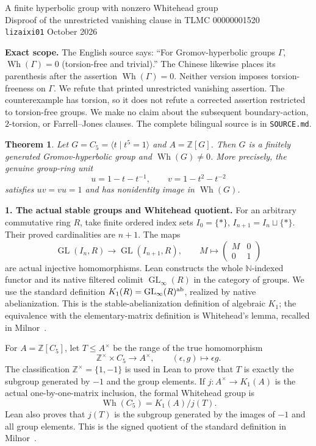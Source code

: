 \documentclass[10pt]{article}
\newtheorem{theorem}{Theorem}
\newcommand{\Z}{\mathbb Z}
\newcommand{\Wh}{\operatorname{Wh}}
\newcommand{\GL}{\operatorname{GL}}
\begin{document}
\begin{center}
{\Large A finite hyperbolic group with nonzero Whitehead group}\\[4pt]
{\large Disproof of the unrestricted vanishing clause in TLMC 00000001520}\\[3pt]
\texttt{lizaixi01} October 2026
\end{center}

\textbf{Exact scope.}
The English source says: ``For Gromov-hyperbolic groups $\Gamma$,
$\Wh(\Gamma)=0$ (torsion-free and trivial).'' The Chinese likewise places
its parenthesis after the assertion $\Wh(\Gamma)=0$. Neither version
imposes torsion-freeness on $\Gamma$. We refute that printed unrestricted
vanishing assertion. The counterexample has torsion, so it does not
refute a corrected assertion restricted to torsion-free groups. We make
no claim about the subsequent boundary-action, $2$-torsion, or
Farrell--Jones clauses. The complete bilingual source is in \texttt{SOURCE.md}.

\begin{theorem}
Let $G=C_5=\langle t\mid t^5=1\rangle$ and $A=\Z[G]$. Then $G$ is
a finitely generated Gromov-hyperbolic group and $\Wh(G)\ne0$.
More precisely, the genuine group-ring unit
\[
 u=1-t-t^{-1},\qquad v=1-t^2-t^{-2}
\]
satisfies $uv=vu=1$ and has nonidentity image in $\Wh(G)$.
\end{theorem}

\textbf{1. The actual stable groups and Whitehead quotient.}
For an arbitrary commutative ring $R$, take finite ordered index sets
$I_0=\{*\}$, $I_{n+1}=I_n\sqcup\{*\}$. Their proved cardinalities are
$n+1$. The maps
\[
 \GL(I_n,R)\longrightarrow\GL(I_{n+1},R),\qquad
 M\longmapsto\begin{pmatrix}M&0\\0&1\end{pmatrix}
\]
are actual injective homomorphisms. Lean constructs the whole
$\mathbb N$-indexed functor and its native filtered colimit $\GL_\infty(R)$
in the category of groups. We use the standard definition
$K_1(R)=\GL_\infty(R)^{\rm ab}$, realized by native abelianization.
This is the stable-abelianization definition of algebraic $K_1$;
the equivalence with the elementary-matrix definition is Whitehead's
lemma, recalled in Milnor~\cite[pp.~358--360]{Milnor}.

For $A=\Z[C_5]$, let $T\le A^\times$ be the range of the true homomorphism
\[
 \Z^\times\times C_5\longrightarrow A^\times,\qquad (\epsilon,g)\mapsto\epsilon g.
\]
The classification $\Z^\times=\{1,-1\}$ is used in Lean to prove that
$T$ is exactly the subgroup generated by $-1$ and the group elements.
If $j:A^\times\to K_1(A)$ is the actual one-by-one-matrix inclusion,
the formal Whitehead group is
\[
 \Wh(C_5)=K_1(A)/j(T).
\]
Lean also proves that $j(T)$ is the subgroup generated by the images
of $-1$ and all group elements. This is the signed quotient of the
standard definition in Milnor~\cite[p.~373]{Milnor}.
\end{document}
